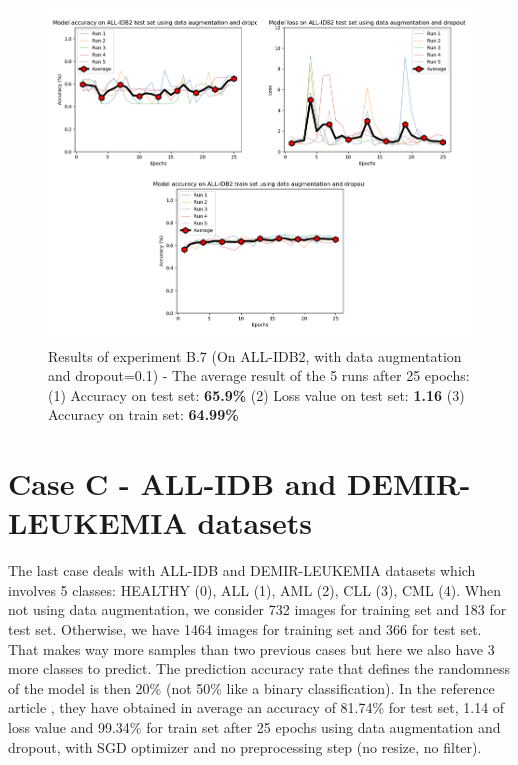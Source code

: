 \documentclass[11pt, openany]{report}
\theoremstyle{plain}
\theoremstyle{definition}
\theoremstyle{remark}
\begin{document}
\begin{figure}[H]
  \centering
  \includegraphics[scale=0.5]{Code/ch6-LeukemiaSubtypes/figures_result/ALL_IDB2/all_idb2-data_aug_dropout.PNG}
  \caption{Results of experiment B.7 (On ALL-IDB2, with data augmentation and dropout=0.1) - The average result of the 5 runs after 25 epochs: (1) Accuracy on test set: \textbf{65.9\%} (2) Loss value on test set: \textbf{1.16} (3) Accuracy on train set: \textbf{64.99\%}}
  \label{fig:results-B7}
\end{figure}



\section{Case C - ALL-IDB and DEMIR-LEUKEMIA datasets} \label{sec:appendix-case-C}

The last case deals with ALL-IDB and DEMIR-LEUKEMIA datasets which involves 5 classes: HEALTHY (0), ALL (1), AML (2), CLL (3), CML (4). When not using data augmentation, we consider 732 images for training set and 183 for test set. Otherwise, we have 1464 images for training set and 366 for test set. That makes way more samples than two previous cases but here we also have 3 more classes to predict. The prediction accuracy rate that defines the randomness of the model is then 20\% (not 50\% like a binary classification). In the reference article \cite{leukemia}, they have obtained in average an accuracy of 81.74\% for test set, 1.14 of loss value and 99.34\% for train set after 25 epochs using data augmentation and dropout, with SGD optimizer and no preprocessing step (no resize, no filter).    
\end{document}
